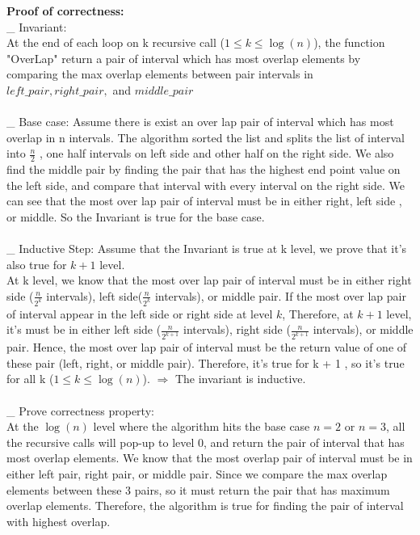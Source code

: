 \documentclass[11pt]{article}
\newcommand{\tab}{\hspace*{2em}}
\begin{document}
\noindent
\textbf{Proof of correctness:}\\
\_ Invariant:\\
\tab At the end of each loop on k recursive call ($1 \leqslant k \leqslant \log(n)$), the function "OverLap" return a pair of interval which has most overlap elements by comparing the max overlap elements between pair intervals in $left\_ pair, right\_ pair,$ and $middle\_pair$\\
\\
\_ Base case: 
Assume there is exist an over lap pair of interval which has most overlap in n intervals. The algorithm sorted the list and splits the list of interval into $\frac{n}{2}$ , one half intervals on left side and other half on the right side. We also find the middle pair by finding the pair that has the highest end point value on the left side, and compare that interval with every interval on the right side. We can see that the most over lap pair of interval must be in either right, left side , or middle. So the Invariant is true for the base case.
\\
\\
\_ Inductive Step:
Assume that the Invariant is true at k level, we prove that it's also true for $k + 1$ level.
\\
At k level, we know that the most over lap pair of interval must be in either right side ($\frac{n}{2^k}$ intervals), left side($\frac{n}{2^k}$ intervals), or middle pair. If the most over lap pair of interval appear in the left side or right side at level $k$,
Therefore, at $k + 1$ level, it's must be in either left side ($\frac{n}{2^{k+1}}$ intervals), right side ($\frac{n}{2^{k+1}}$ intervals), or middle pair. Hence, the most over lap pair of interval must be the return value of one of these pair (left, right, or middle pair). Therefore, it's true for k + 1 , so it's true for all k ($1 \leqslant k \leqslant \log(n)$). 
$\Rightarrow$ The invariant is inductive.
\\
\\
\_ Prove correctness property:\\
At the $\log(n)$ level where the algorithm hits the base case $n=2$ or $n = 3$,  all the recursive calls will pop-up to level 0, and return the pair of interval that has most overlap elements. We know that the most overlap pair of interval must be in either left pair, right pair, or middle pair. Since we compare the max overlap elements between these 3 pairs, so it must return the pair that has maximum overlap elements. Therefore, the algorithm is true for finding the pair of interval with highest overlap.
\end{document}
